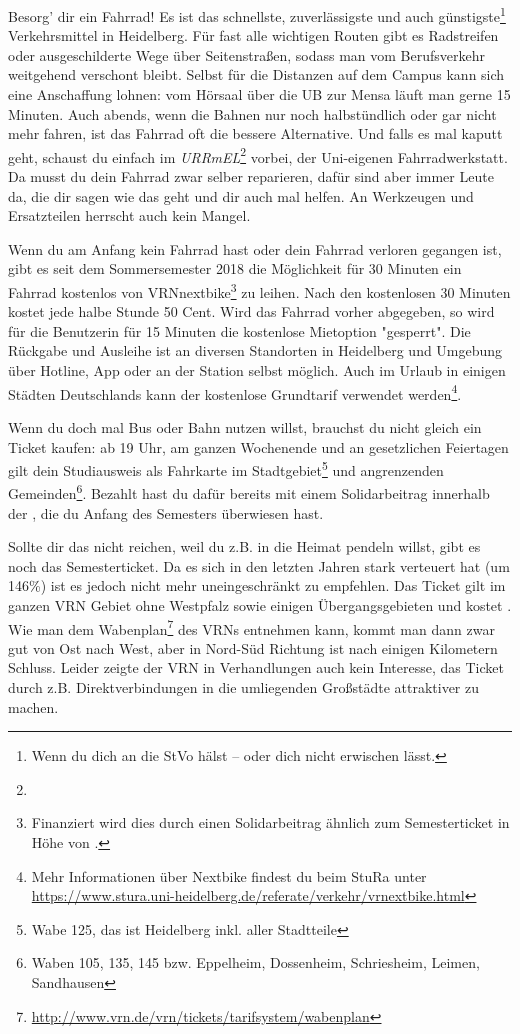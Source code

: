 Besorg' dir ein Fahrrad! Es ist das schnellste, zuverlässigste und auch günstigste\footnote{Wenn du dich an die StVo hälst -- oder dich nicht erwischen lässt.} Verkehrsmittel in Heidelberg. Für fast alle wichtigen Routen gibt es Radstreifen oder ausgeschilderte Wege über Seitenstraßen, sodass man vom Berufsverkehr weitgehend verschont bleibt. Selbst für die Distanzen auf dem Campus kann sich eine Anschaffung lohnen: vom Hörsaal über die \gls{UB} zur Mensa läuft man gerne 15 Minuten. Auch abends, wenn die Bahnen nur noch halbstündlich oder gar nicht mehr fahren, ist das Fahrrad oft die bessere Alternative. Und falls es mal kaputt geht, schaust du einfach im \emph{URRmEL}\footnote{\urrmelOeff} vorbei, der Uni-eigenen Fahrradwerkstatt. Da musst du dein Fahrrad zwar selber reparieren, dafür sind aber immer Leute da, die dir sagen wie das geht und dir auch mal helfen. An Werkzeugen und Ersatzteilen herrscht auch kein Mangel.

\label{nextbike}
Wenn du am Anfang kein Fahrrad hast oder dein Fahrrad verloren gegangen ist, gibt es seit dem Sommersemester 2018 die Möglichkeit für 30 Minuten ein Fahrrad kostenlos von VRNnextbike\footnote{Finanziert wird dies durch einen Solidarbeitrag ähnlich zum Semesterticket in Höhe von .} zu leihen. Nach den kostenlosen 30 Minuten kostet jede halbe Stunde 50 Cent. Wird das Fahrrad vorher abgegeben, so wird für die Benutzerin für 15 Minuten die kostenlose Mietoption "gesperrt". Die Rückgabe und Ausleihe ist an diversen Standorten in Heidelberg und Umgebung über Hotline, App oder an der Station selbst möglich. Auch im Urlaub in einigen Städten Deutschlands kann der kostenlose Grundtarif verwendet werden\footnote{Mehr Informationen über Nextbike findest du beim StuRa unter \url{https://www.stura.uni-heidelberg.de/referate/verkehr/vrnextbike.html}}.

Wenn du doch mal Bus oder Bahn nutzen willst, brauchst du nicht gleich ein Ticket kaufen: ab 19 Uhr, am ganzen Wochenende und an gesetzlichen Feiertagen gilt dein Studiausweis als Fahrkarte im Stadtgebiet\footnote{Wabe 125, das ist Heidelberg inkl. aller Stadtteile} und angrenzenden Gemeinden\footnote{Waben 105, 135, 145 bzw. Eppelheim, Dossenheim, Schriesheim, Leimen, Sandhausen}. Bezahlt hast du dafür bereits mit einem Solidarbeitrag innerhalb der \EUR{\beitragssumme}, die du Anfang des Semesters überwiesen hast.

Sollte dir das nicht reichen, weil du z.B. in die Heimat pendeln willst, gibt es noch das Semesterticket. Da es sich in den letzten Jahren stark verteuert hat (um 146\%) ist es jedoch nicht mehr uneingeschränkt zu empfehlen. Das Ticket gilt im ganzen VRN Gebiet ohne Westpfalz sowie einigen Übergangsgebieten und kostet \EUR{\semesterticket}. Wie man dem Wabenplan\footnote{\url{http://www.vrn.de/vrn/tickets/tarifsystem/wabenplan}} des \glspl{VRN} entnehmen kann, kommt man dann zwar gut von Ost nach West, aber in Nord-Süd Richtung ist nach einigen Kilometern Schluss. Leider zeigte der \gls{VRN} in Verhandlungen auch kein Interesse, das Ticket durch z.B. Direktverbindungen in die umliegenden Großstädte attraktiver zu machen.

